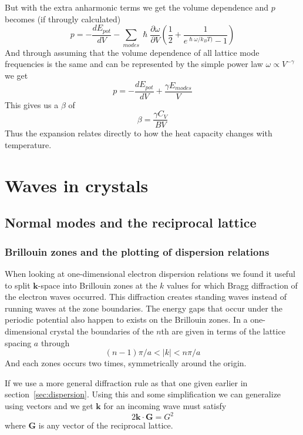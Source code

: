 \documentclass[11pt]{article}
\begin{document}
But with the extra anharmonic terms we get the volume dependence and $p$ becomes (if througly calculated)
\begin{equation}
	p = - \frac{d E_{pot}}{dV} - \sum_{modes} \hslash \frac{\partial \omega}{\partial V} (\frac{1}{2} + \frac{1}{e^{\hslash \omega/k_B T)} - 1})
\end{equation}
And through assuming that the volume dependence of all lattice mode frequencies is the same and can be represented by the simple power law $\omega \propto V^{-\gamma}$ we get
\begin{equation}
p = - \frac{dE_{pot}}{dV} + \frac{\gamma E_{modes}}{V}
\end{equation}
This gives us a $\beta$ of
\begin{equation}
	\beta = \frac{\gamma C_V}{BV}
\end{equation}
Thus the expansion relates directly to how the heat capacity changes with temperature.


\section{Waves in crystals}
\subsection{Normal modes and the reciprocal lattice}
\subsubsection{Brillouin zones and the plotting of dispersion relations}
When looking at one-dimensional electron dispersion relations we found it useful to split $\pmb{k}$-space into Brillouin zones at the $k$ values for which Bragg diffraction of the electron waves occurred. This diffraction creates standing waves instead of running waves at the zone boundaries. The energy gaps that occur under the periodic potential also happen to exists on the Brillouin zones. In a one-dimensional crystal the boundaries of the $n$th are given in terms of the lattice spacing $a$ through
\begin{equation}
	(n-1)\pi/a < |k| < n \pi / a
\end{equation}	
And each zones occurs two times, symmetrically around the origin. 

If we use a more general diffraction rule as that one given earlier in section~\ref{sec:dispersion}. Using this and some simplification we can generalize using vectors and we get $\pmb{k}$ for an incoming wave must satisfy
\begin{equation}
	2\pmb{k} \cdot \pmb{G} = G^2
\end{equation}
where $\pmb{G}$ is any vector of the reciprocal lattice. 
\end{document}
